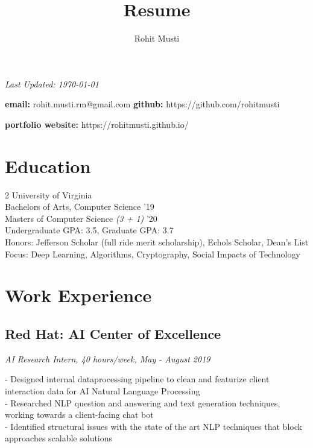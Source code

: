 \documentclass{article}
\makeatletter
\renewcommand{\maketitle}{

    
    {\noindent\huge\bfseries\theauthor} \hfill \textit{Last Updated: \today}

    \vspace{0.25em}

    \noindent\textbf{email:} rohit.musti.rm@gmail.com \textbf{github:} https://github.com/rohitmusti
    
    \noindent\textbf{portfolio website:} https://rohitmusti.github.io/ 
}
\makeatother
\begin{document}
\title{Resume}
\author{Rohit Musti}

\maketitle
\vspace{-.35em}

\section{Education}

\setlength{\columnsep}{-17em}
\vspace{-1em}
\begin{multicols}{2}
    \noindent University of Virginia \\ 
    Bachelors of Arts, Computer Science '19 \\
    Masters of Computer Science \textit{(3 + 1)} '20 \\

    \columnbreak
    \noindent Undergraduate GPA: 3.5, Graduate GPA: 3.7 \\
    Honors: Jefferson Scholar (full ride merit scholarship), Echols Scholar, Dean's List \\ 
    Focus: Deep Learning, Algorithms, Cryptography, Social Impacts of Technology
\end{multicols}
\vspace{-2.5em}

\section{Work Experience}
\vspace{.15em}

\subsection{Red Hat: AI Center of Excellence} \hfill \textit{AI Research Intern, 40 hours/week, May - August 2019}

\noindent - Designed internal dataprocessing pipeline to clean and featurize client interaction data for AI Natural Language Processing \\
- Researched NLP question and answering and text generation techniques, working towards a client-facing chat bot\\
- Identified structural issues with the state of the art NLP techniques that block approaches scalable solutions
\vspace{.15em}
\end{document}
